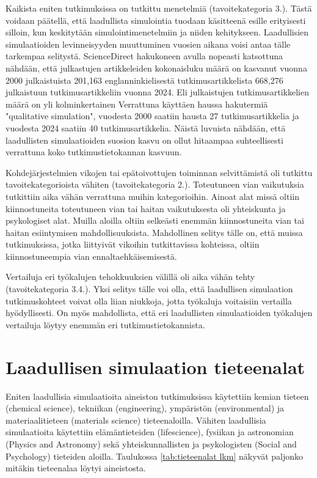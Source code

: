\documentclass[utf8]{gradu3}
\begin{document}
Kaikista eniten tutkimuksissa on tutkittu menetelmiä (tavoitekategoria 3.).
Tästä voidaan päätellä, että laadullista simulointia tuodaan käsitteenä esille
erityisesti silloin, kun keskitytään simulointimenetelmiin ja niiden kehitykseen.
Laadullisien simulaatioiden levinneisyyden muuttuminen vuosien aikana voisi antaa
tälle tarkempaa selitystä. ScienceDirect hakukoneen avulla nopeasti 
katsottuna nähdään, että julkastujen artikkeleiden kokonaisluku määrä on kasvanut 
vuonna 2000 julkaistuista 201,163 englanninkielisestä tutkimusartikkelista 
668,276 julkaistuun tutkimusartikkeliin vuonna 2024. 
Eli julkaistujen tutkimusartikkelien määrä on yli kolminkertainen
Verrattuna käyttäen haussa hakutermiä "qualitative simulation", 
vuodesta 2000 saatiin hausta 27 tutkimusartikkelia 
ja vuodesta 2024 saatiin 40 tutkimusartikkelia. 
Näistä luvuista nähdään, että laadullisten simulaatioiden suosion kasvu
on ollut hitaampaa suhteellisesti verrattuna koko tutkimustietokannan kasvuun.

Kohdejärjestelmien vikojen tai epätoivottujen toiminnan selvittämistä 
oli tutkittu tavoitekategorioista vähiten (tavoitekategoria 2.).
Toteutuneen vian vaikutuksia tutkittiin aika vähän 
verrattuna muihin kategorioihin. 
Ainoat alat missä oltiin kiinnostuneita toteutuneen vian tai haitan vaikutuksesta
oli yhteiskunta ja psykologiset alat. 
Muilla aloilla oltiin selkeästi enemmän kiinnostuneita
vian tai haitan esiintymisen mahdollisuuksista.
Mahdollinen selitys tälle on, että muissa tutkimuksissa, 
jotka liittyivät vikoihin tutkittavissa kohteissa, 
oltiin kiinnostuneempia vian ennaltaehkäisemisestä.

Vertailuja eri työkalujen tehokkuuksien välillä oli aika vähän tehty (tavoitekategoria 3.4.). 
Yksi selitys tälle voi olla, että laadullisen simulaation tutkimuskohteet 
voivat olla liian niukkoja, jotta työkaluja voitaisiin vertailla hyödyllisesti.
On myös mahdollista, että eri laadullisten simulaatioiden työkalujen vertailuja 
löytyy enemmän eri tutkimustietokannista.

\section{Laadullisen simulaation tieteenalat}
Eniten laadullisia simulaatioita aineiston tutkimuksissa
käytettiin kemian tieteen (chemical science),
tekniikan (engineering), ympäristön (environmental) ja materiaalitieteen  (materials science) tieteenaloilla. 
Vähiten laadullisia simulaatioita käytettiin elämäntieteiden (lifescience),
fysiikan ja astronomian  (Physics and Astronomy) sekä 
yhteiskunnallisten ja psykologisten (Social and Psychology) tieteiden aloilla.
Taulukossa \ref{tab:tieteenalat lkm} näkyvät paljonko mitäkin tieteenalaa
löytyi aineistosta.
\end{document}
